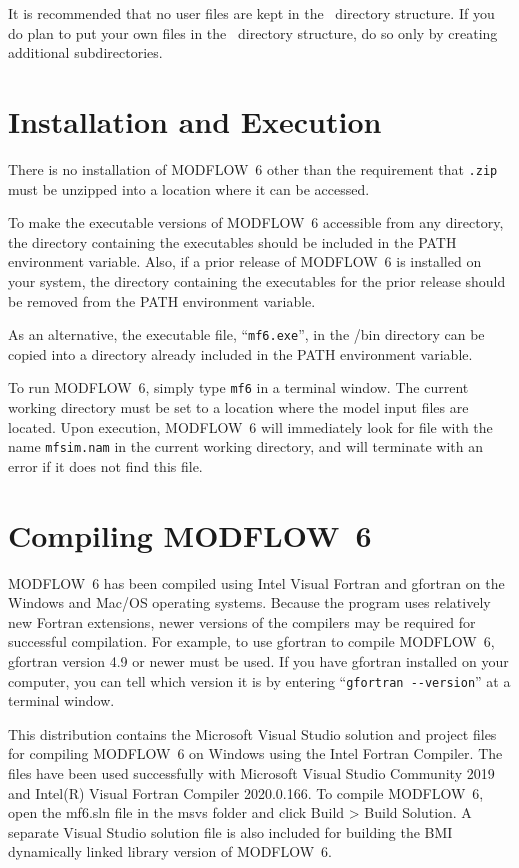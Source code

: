 \documentclass[11pt,twoside,twocolumn]{usgsreport}
\begin{document}
It is recommended that no user files are kept in the \modflowversion~directory structure.  If you do plan to put your own files in the \modflowversion~directory structure, do so only by creating additional subdirectories.

\section{Installation and Execution}
There is no installation of MODFLOW~6 other than the requirement that \texttt{\modflowversion.zip} must be unzipped into a location where it can be accessed.  

To make the executable versions of MODFLOW~6 accessible from any directory, the directory containing the executables should be included in the PATH environment variable.  Also, if a prior release of MODFLOW~6 is installed on your system, the directory containing the executables for the prior release should be removed from the PATH environment variable.

As an alternative, the executable file, ``\texttt{mf6.exe}'', in the \modflowversion{}/bin directory can be copied into a directory already included in the PATH environment variable.

To run MODFLOW~6, simply type \texttt{mf6} in a terminal window.  The current working directory must be set to a location where the model input files are located.  Upon execution, MODFLOW~6 will immediately look for file with the name \texttt{mfsim.nam} in the current working directory, and will terminate with an error if it does not find this file.

\section{Compiling MODFLOW~6}
MODFLOW~6 has been compiled using Intel Visual Fortran and gfortran on the Windows and Mac/OS operating systems.  Because the program uses relatively new Fortran extensions, newer versions of the compilers may be required for successful compilation.  For example, to use gfortran to compile MODFLOW~6, gfortran version 4.9 or newer must be used.  If you have gfortran installed on your computer, you can tell which version it is by entering ``\verb|gfortran --version|'' at a terminal window.

This distribution contains the Microsoft Visual Studio solution and project files for compiling MODFLOW~6 on Windows using the Intel Fortran Compiler.  The files have been used successfully with Microsoft Visual Studio Community 2019 and Intel(R) Visual Fortran Compiler 2020.0.166.  To compile MODFLOW~6, open the mf6.sln file in the msvs folder and click Build >  Build Solution.  A separate Visual Studio solution file is also included for building the BMI dynamically linked library version of MODFLOW~6.
\end{document}

